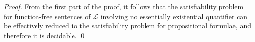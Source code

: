 \documentclass[a4paper]{llncs}
\newcommand{\Lang}{\ensuremath{\mathcal{L}\xspace}} %
\newcommand{\HExp}{Exp}
\begin{document}
\begin{proof}
 From the first part of the proof, it follows that the satisfiability 
problem for function-free sentences of $\Lang$ involving no 
essentially existential quantifier can be effectively reduced to the 
satisfiability problem for propositional formulae, and therefore it 
is decidable.
\qed
%
%
%
%
%
%
%

\end{proof}
\end{document}
